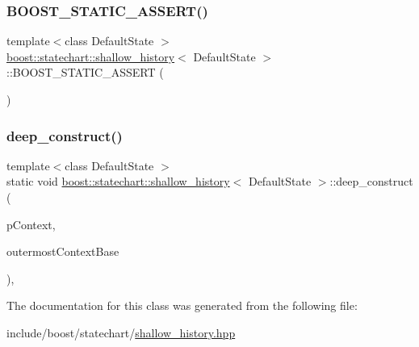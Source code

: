 \subsubsection{\texorpdfstring{B\+O\+O\+S\+T\+\_\+\+S\+T\+A\+T\+I\+C\+\_\+\+A\+S\+S\+E\+R\+T()}{BOOST\_STATIC\_ASSERT()}}
{\footnotesize\ttfamily template$<$class Default\+State $>$ \\
\mbox{\hyperlink{classboost_1_1statechart_1_1shallow__history}{boost\+::statechart\+::shallow\+\_\+history}}$<$ Default\+State $>$\+::B\+O\+O\+S\+T\+\_\+\+S\+T\+A\+T\+I\+C\+\_\+\+A\+S\+S\+E\+RT (\begin{DoxyParamCaption}\item[{Default\+State\+::context\+\_\+type\+::shallow\+\_\+history$<$ Default\+State $>$\+::value}]{ }\end{DoxyParamCaption})}

\mbox{\label{classboost_1_1statechart_1_1shallow__history_af903cba949c3ff7becebca038e27cef6}} 
\subsubsection{\texorpdfstring{deep\+\_\+construct()}{deep\_construct()}}
{\footnotesize\ttfamily template$<$class Default\+State $>$ \\
static void \mbox{\hyperlink{classboost_1_1statechart_1_1shallow__history}{boost\+::statechart\+::shallow\+\_\+history}}$<$ Default\+State $>$\+::deep\+\_\+construct (\begin{DoxyParamCaption}\item[{const \mbox{\hyperlink{classboost_1_1statechart_1_1shallow__history_a6433a73f2c4b7e7c42e2e2618c0ff784}{context\+\_\+ptr\+\_\+type}} \&}]{p\+Context,  }\item[{\mbox{\hyperlink{classboost_1_1statechart_1_1shallow__history_a26036d97ce8fe35752f8397c63673f21}{outermost\+\_\+context\+\_\+base\+\_\+type}} \&}]{outermost\+Context\+Base }\end{DoxyParamCaption})\hspace{0.3cm}{\ttfamily [inline]}, {\ttfamily [static]}}



The documentation for this class was generated from the following file\+:\begin{DoxyCompactItemize}
\item 
include/boost/statechart/\mbox{\hyperlink{shallow__history_8hpp}{shallow\+\_\+history.\+hpp}}\end{DoxyCompactItemize}
